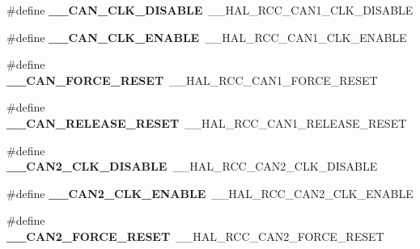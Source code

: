 \begin{DoxyCompactItemize}
\item 
\hypertarget{group___h_a_l___r_c_c___aliased_ga6220a8791572fb0238df8d71e7717e82}{\#define {\bfseries \-\_\-\-\_\-\-C\-A\-N\-\_\-\-C\-L\-K\-\_\-\-D\-I\-S\-A\-B\-L\-E}~\-\_\-\-\_\-\-H\-A\-L\-\_\-\-R\-C\-C\-\_\-\-C\-A\-N1\-\_\-\-C\-L\-K\-\_\-\-D\-I\-S\-A\-B\-L\-E}\label{group___h_a_l___r_c_c___aliased_ga6220a8791572fb0238df8d71e7717e82}

\item 
\hypertarget{group___h_a_l___r_c_c___aliased_ga1f1f9b1511361f0cfebe7983143b0005}{\#define {\bfseries \-\_\-\-\_\-\-C\-A\-N\-\_\-\-C\-L\-K\-\_\-\-E\-N\-A\-B\-L\-E}~\-\_\-\-\_\-\-H\-A\-L\-\_\-\-R\-C\-C\-\_\-\-C\-A\-N1\-\_\-\-C\-L\-K\-\_\-\-E\-N\-A\-B\-L\-E}\label{group___h_a_l___r_c_c___aliased_ga1f1f9b1511361f0cfebe7983143b0005}

\item 
\hypertarget{group___h_a_l___r_c_c___aliased_gaf5c34ac74804a9d5b5847ae0cc9a549a}{\#define {\bfseries \-\_\-\-\_\-\-C\-A\-N\-\_\-\-F\-O\-R\-C\-E\-\_\-\-R\-E\-S\-E\-T}~\-\_\-\-\_\-\-H\-A\-L\-\_\-\-R\-C\-C\-\_\-\-C\-A\-N1\-\_\-\-F\-O\-R\-C\-E\-\_\-\-R\-E\-S\-E\-T}\label{group___h_a_l___r_c_c___aliased_gaf5c34ac74804a9d5b5847ae0cc9a549a}

\item 
\hypertarget{group___h_a_l___r_c_c___aliased_gacc167159c85593d2ba0a5b90c693656b}{\#define {\bfseries \-\_\-\-\_\-\-C\-A\-N\-\_\-\-R\-E\-L\-E\-A\-S\-E\-\_\-\-R\-E\-S\-E\-T}~\-\_\-\-\_\-\-H\-A\-L\-\_\-\-R\-C\-C\-\_\-\-C\-A\-N1\-\_\-\-R\-E\-L\-E\-A\-S\-E\-\_\-\-R\-E\-S\-E\-T}\label{group___h_a_l___r_c_c___aliased_gacc167159c85593d2ba0a5b90c693656b}

\item 
\hypertarget{group___h_a_l___r_c_c___aliased_ga0e19c4cf4794f8001f4b61cc23d330bb}{\#define {\bfseries \-\_\-\-\_\-\-C\-A\-N2\-\_\-\-C\-L\-K\-\_\-\-D\-I\-S\-A\-B\-L\-E}~\-\_\-\-\_\-\-H\-A\-L\-\_\-\-R\-C\-C\-\_\-\-C\-A\-N2\-\_\-\-C\-L\-K\-\_\-\-D\-I\-S\-A\-B\-L\-E}\label{group___h_a_l___r_c_c___aliased_ga0e19c4cf4794f8001f4b61cc23d330bb}

\item 
\hypertarget{group___h_a_l___r_c_c___aliased_gacd5af93932804a6d0daf1a57756a2624}{\#define {\bfseries \-\_\-\-\_\-\-C\-A\-N2\-\_\-\-C\-L\-K\-\_\-\-E\-N\-A\-B\-L\-E}~\-\_\-\-\_\-\-H\-A\-L\-\_\-\-R\-C\-C\-\_\-\-C\-A\-N2\-\_\-\-C\-L\-K\-\_\-\-E\-N\-A\-B\-L\-E}\label{group___h_a_l___r_c_c___aliased_gacd5af93932804a6d0daf1a57756a2624}

\item 
\hypertarget{group___h_a_l___r_c_c___aliased_ga0758ced4a5165755753da05edd59734c}{\#define {\bfseries \-\_\-\-\_\-\-C\-A\-N2\-\_\-\-F\-O\-R\-C\-E\-\_\-\-R\-E\-S\-E\-T}~\-\_\-\-\_\-\-H\-A\-L\-\_\-\-R\-C\-C\-\_\-\-C\-A\-N2\-\_\-\-F\-O\-R\-C\-E\-\_\-\-R\-E\-S\-E\-T}\label{group___h_a_l___r_c_c___aliased_ga0758ced4a5165755753da05edd59734c}


\end{DoxyCompactItemize}
